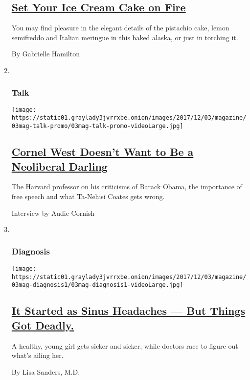 \begin{enumerate}
  \hypertarget{set-your-ice-cream-cake-on-fire}{%
  \subsection{\texorpdfstring{\href{/2017/12/01/magazine/ice-cream-cake-baked-alaska-meringue-pistachio-cake-lemon-semifreddo.html}{Set
  Your Ice Cream Cake on
  Fire}}{Set Your Ice Cream Cake on Fire}}\label{set-your-ice-cream-cake-on-fire}}

  You may find pleasure in the elegant details of the pistachio cake,
  lemon semifreddo and Italian meringue in this baked alaska, or just in
  torching it.

  By Gabrielle Hamilton
\item ~
  \hypertarget{talk}{%
  \subsubsection{Talk}\label{talk}}

  \texttt{[image: https://static01.graylady3jvrrxbe.onion/images/2017/12/03/magazine/03mag-talk-promo/03mag-talk-promo-videoLarge.jpg]}

  \hypertarget{cornel-west-doesnt-want-to-be-a-neoliberal-darling}{%
  \subsection{\texorpdfstring{\href{/2017/11/29/magazine/cornel-west-doesnt-want-to-be-a-neoliberal-darling.html}{Cornel
  West Doesn't Want to Be a Neoliberal
  Darling}}{Cornel West Doesn't Want to Be a Neoliberal Darling}}\label{cornel-west-doesnt-want-to-be-a-neoliberal-darling}}

  The Harvard professor on his criticisms of Barack Obama, the
  importance of free speech and what Ta-Nehisi Coates gets wrong.

  Interview by Audie Cornish
\item ~
  \hypertarget{diagnosis}{%
  \subsubsection{Diagnosis}\label{diagnosis}}

  \texttt{[image: https://static01.graylady3jvrrxbe.onion/images/2017/12/03/magazine/03mag-diagnosis1/03mag-diagnosis1-videoLarge.jpg]}

  \hypertarget{it-started-as-sinus-headaches--but-things-got-deadly}{%
  \subsection{\texorpdfstring{\href{/2017/11/30/magazine/it-started-as-sinus-headaches-but-things-got-deadly.html}{It
  Started as Sinus Headaches --- But Things Got
  Deadly.}}{It Started as Sinus Headaches --- But Things Got Deadly.}}\label{it-started-as-sinus-headaches--but-things-got-deadly}}

  A healthy, young girl gets sicker and sicker, while doctors race to
  figure out what's ailing her.

  By Lisa Sanders, M.D.
\end{enumerate}

